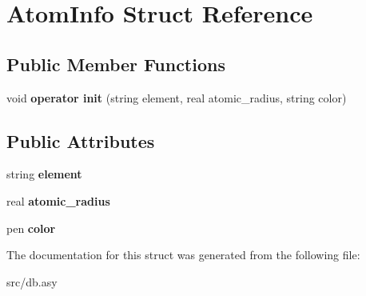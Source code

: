 \hypertarget{structAtomInfo}{\section{Atom\+Info Struct Reference}
\label{structAtomInfo}
}
\subsection*{Public Member Functions}
\begin{DoxyCompactItemize}
\item 
\hypertarget{structAtomInfo_a18c047b52b7d58f5a1f6299abb8e271c}{void {\bfseries operator init} (string element, real atomic\+\_\+radius, string color)}\label{structAtomInfo_a18c047b52b7d58f5a1f6299abb8e271c}

\end{DoxyCompactItemize}
\subsection*{Public Attributes}
\begin{DoxyCompactItemize}
\item 
\hypertarget{structAtomInfo_a4242fbe779be6f217b1be622176326a3}{string {\bfseries element}}\label{structAtomInfo_a4242fbe779be6f217b1be622176326a3}

\item 
\hypertarget{structAtomInfo_a6cfe07e180bcab615c20080d53ded66a}{real {\bfseries atomic\+\_\+radius}}\label{structAtomInfo_a6cfe07e180bcab615c20080d53ded66a}

\item 
\hypertarget{structAtomInfo_af67e03658b15091ffe7587a1d6edbb55}{pen {\bfseries color}}\label{structAtomInfo_af67e03658b15091ffe7587a1d6edbb55}

\end{DoxyCompactItemize}


The documentation for this struct was generated from the following file\+:\begin{DoxyCompactItemize}
\item 
src/db.\+asy\end{DoxyCompactItemize}
